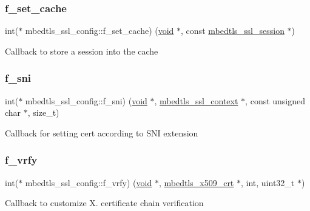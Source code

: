 \subsubsection{\texorpdfstring{f\+\_\+set\+\_\+cache}{f\_set\_cache}}
{\footnotesize\ttfamily int($\ast$ mbedtls\+\_\+ssl\+\_\+config\+::f\+\_\+set\+\_\+cache) (\hyperlink{interfacevoid}{void} $\ast$, const \hyperlink{structmbedtls__ssl__session}{mbedtls\+\_\+ssl\+\_\+session} $\ast$)}

Callback to store a session into the cache \mbox{\label{structmbedtls__ssl__config_a00e330604cc40f0097b5f8ad3fb7b297}} 
\subsubsection{\texorpdfstring{f\+\_\+sni}{f\_sni}}
{\footnotesize\ttfamily int($\ast$ mbedtls\+\_\+ssl\+\_\+config\+::f\+\_\+sni) (\hyperlink{interfacevoid}{void} $\ast$, \hyperlink{structmbedtls__ssl__context}{mbedtls\+\_\+ssl\+\_\+context} $\ast$, const unsigned char $\ast$, size\+\_\+t)}

Callback for setting cert according to S\+NI extension \mbox{\label{structmbedtls__ssl__config_ab79f1ffbe0f2ee8519f22fd6611dbb63}} 
\subsubsection{\texorpdfstring{f\+\_\+vrfy}{f\_vrfy}}
{\footnotesize\ttfamily int($\ast$ mbedtls\+\_\+ssl\+\_\+config\+::f\+\_\+vrfy) (\hyperlink{interfacevoid}{void} $\ast$, \hyperlink{structmbedtls__x509__crt}{mbedtls\+\_\+x509\+\_\+crt} $\ast$, int, uint32\+\_\+t $\ast$)}

Callback to customize X. certificate chain verification \mbox{\label{structmbedtls__ssl__config_afbcfe1cdb3e42ee1d1e14352cefde29e}} 
